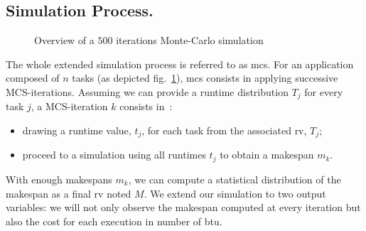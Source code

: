 \documentclass[]{llncs}
\begin{document}
\subsection{Simulation Process.}
\begin{figure}
	\centering
	\resizebox{0.6\textwidth}{!}{%
		
		}
\caption{Overview of a $500$ iterations Monte-Carlo simulation}\label{fig:mc-process}
\end{figure}
The whole extended simulation process is referred to as \ac{mcs}. 
For an application composed of $n$ tasks (as depicted fig.~\ref{fig:mc-process}),
\ac{mcs} consists in applying successive MCS-iterations. Assuming we can provide a
runtime distribution $T_j$ for every task $j$, a MCS-iteration $k$ consists in~:
\begin{itemize}
\item drawing a runtime value, $t_j$, for each task from the associated
	\acs{rv}, $T_j$;
\item proceed to a simulation using all runtimes $t_j$ to obtain a makespan $m_k$.
\end{itemize}
With enough  makespans $m_k$, we can  compute a statistical distribution  of the
makespan as a  final \ac{rv} noted $M$.  We extend our simulation  to two output
variables: we will not only observe the makespan computed at every iteration but
also the cost for each execution in number of \ac{btu}.
\end{document}
